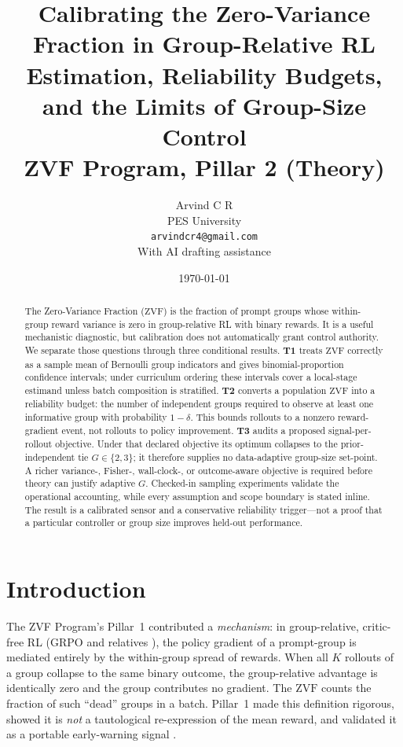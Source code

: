 \documentclass[11pt]{article}
\title{\textbf{Calibrating the Zero-Variance Fraction in Group-Relative RL}\\[4pt]
\large Estimation, Reliability Budgets, and the Limits of Group-Size Control\\[4pt]
\large ZVF Program, Pillar 2 (Theory)}
\author{Arvind C R\\PES University\\\texttt{arvindcr4@gmail.com}\\[2pt]
\small With AI drafting assistance}
\date{\today}
\theoremstyle{plain}
\theoremstyle{definition}
\theoremstyle{remark}
\newcommand{\ZVF}{\ensuremath{\mathrm{ZVF}}}
\newcommand{\1}{\mathbb{1}}
\begin{document}
\maketitle

\begin{abstract}
The Zero-Variance Fraction (\ZVF{}) is the fraction of prompt groups whose
within-group reward variance is zero in group-relative RL with binary rewards.
It is a useful mechanistic diagnostic, but calibration does not automatically
grant control authority. We separate those questions through three conditional
results. \textbf{T1} treats \ZVF{} correctly as a sample mean of Bernoulli group
indicators and gives binomial-proportion confidence intervals; under curriculum
ordering these intervals cover a local-stage estimand unless batch composition is
stratified. \textbf{T2} converts a population \ZVF{} into a reliability budget:
the number of independent groups required to observe at least one informative
group with probability $1-\delta$. This bounds rollouts to a nonzero
reward-gradient event, not rollouts to policy improvement. \textbf{T3} audits a
proposed signal-per-rollout objective. Under that declared objective its optimum
collapses to the prior-independent tie $G\in\{2,3\}$; it therefore supplies no
data-adaptive group-size set-point. A richer variance-, Fisher-, wall-clock-, or
outcome-aware objective is required before theory can justify adaptive $G$.
Checked-in sampling experiments validate the operational accounting, while every
assumption and scope boundary is stated inline. The result is a calibrated sensor and a
conservative reliability trigger---not a proof that a particular controller or
group size improves held-out performance.
\end{abstract}

\section{Introduction}
The ZVF Program's Pillar~1 contributed a \emph{mechanism}: in group-relative,
critic-free RL (GRPO and relatives \cite{shao2024deepseekmath}), the policy gradient
of a prompt-group is mediated entirely by the within-group spread of rewards.
When all $K$ rollouts of a group collapse to the same binary outcome, the
group-relative advantage is identically zero and the group contributes no
gradient. The \ZVF{} counts the fraction of such ``dead'' groups in a batch.
Pillar~1 made this definition rigorous, showed it is \emph{not} a tautological
re-expression of the mean reward, and validated it as a portable early-warning
signal \cite{zvfaudit2026}.
\end{document}
